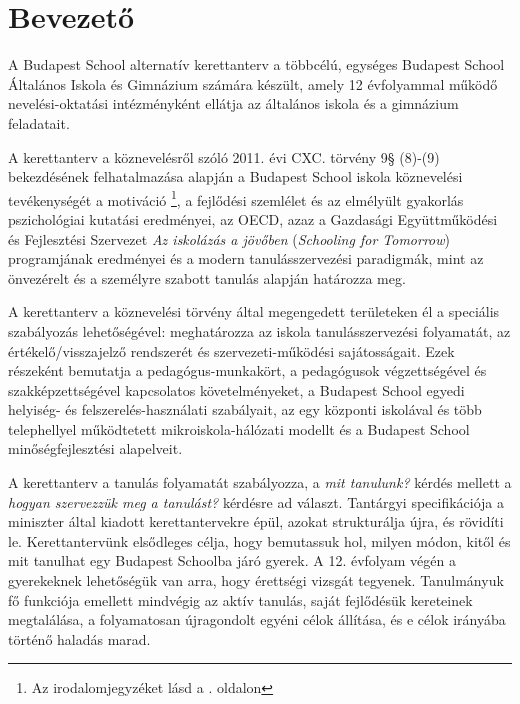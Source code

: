 \chapter{Bevezető}
A Budapest School alternatív kerettanterv a többcélú, egységes	Budapest School
Általános Iskola és Gimnázium számára készült, amely 12 évfolyammal működő
nevelési-oktatási intézményként ellátja az általános iskola és a gimnázium
feladatait.

A kerettanterv a köznevelésről szóló 2011. évi CXC. törvény 9§ (8)-(9)
bekezdésének felhatalmazása alapján a Budapest School iskola köznevelési
tevékenységét a motiváció \citep{pink2011drive}\footnote{Az irodalomjegyzéket
    lásd a \pageref{sec:bibliographyk}. oldalon}, a fejlődési szemlélet
\citep{growthmindset} és az elmélyült gyakorlás \citep{ericsson2016peak}
pszichológiai kutatási eredményei, az  OECD, azaz a Gazdasági Együttműködési és
Fejlesztési Szervezet \emph{Az iskolázás a jövőben}  (\emph{Schooling for Tomorrow})
programjának eredményei \citep{2006schooling}
és a modern tanulásszervezési paradigmák, mint az önvezérelt
\citep{mitra2012beyond} és a személyre szabott \citep{khan2012one} tanulás
alapján határozza meg.

A kerettanterv a köznevelési törvény által megengedett területeken él a
speciális szabályozás lehetőségével: meghatározza az iskola tanulásszervezési
folyamatát, az értékelő/visszajelző rendszerét és szervezeti-működési
sajátosságait. Ezek részeként bemutatja a pedagógus-munkakört, a pedagógusok
végzettségével és szakképzettségével kapcsolatos követelményeket, a Budapest
School	egyedi helyiség- és felszerelés-használati szabályait, az egy központi
iskolával és több telephellyel működtetett mikroiskola-hálózati modellt és a
Budapest School minőségfejlesztési alapelveit.

A kerettanterv	a tanulás folyamatát szabályozza, a \emph{mit tanulunk?} kérdés
mellett a \emph{hogyan szervezzük meg a tanulást?} kérdésre ad választ.
Tantárgyi specifikációja a miniszter által kiadott kerettantervekre
\citep{ofi:kerettanterv} épül, azokat strukturálja újra, és rövidíti le.
Kerettantervünk elsődleges célja, hogy bemutassuk hol, milyen módon, kitől és
mit tanulhat egy Budapest Schoolba járó gyerek. A 12. évfolyam
végén a gyerekeknek lehetőségük van arra, hogy érettségi vizsgát tegyenek. Tanulmányuk
fő funkciója emellett mindvégig az aktív tanulás, saját fejlődésük kereteinek
megtalálása, a folyamatosan újragondolt egyéni célok állítása, és e célok
irányába történő haladás marad.

